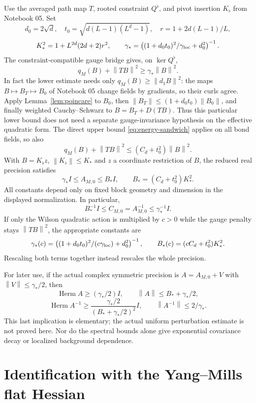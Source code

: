 \documentclass[11pt]{article}
\theoremstyle{remark}
\newcommand{\norm}[1]{\left\|#1\right\|}
\newcommand{\Herm}{\operatorname{Herm}}
\begin{document}
Use the averaged path map $T$, rooted constraint $Q^\flat$, and
pivot insertion $K_\flat$ from Notebook 05. Set
\[
 d_0=2\sqrt d,\quad
 t_0=\sqrt{d(L-1)(L^d-1)},\quad
 r=1+2d(L-1)/L,
\]
\[
 K_*^2=1+L^{2d}(2d+2)r^2,
 \qquad
 \gamma_*=
 \left((1+d_0t_0)^2/\gamma_{\rm loc}+d_0^2\right)^{-1}.
\]
The constraint-compatible gauge bridge gives, on $\ker Q^\flat$,
\[
 q_M(B)+\norm{TB}^2\ge\gamma_*\norm B^2.
\]
In fact the lower estimate needs only $q_M(B)\ge\norm{d_1B}^2$:
the maps $B\mapsto B_T\mapsto B_0$ of Notebook 05 change fields
by gradients, so their curls agree. Apply Lemma~\ref{lem:poincare}
to $B_0$, then $\norm{B_T}\le(1+d_0t_0)\norm{B_0}$, and finally
weighted Cauchy--Schwarz to $B=B_T+D(TB)$. Thus this particular
lower bound does not need a separate gauge-invariance hypothesis
on the effective quadratic form.
The direct upper bound \eqref{eq:energy-sandwich} applies on all
bond fields, so also
\[
 q_M(B)+\norm{TB}^2\le(C_d+t_0^2)\norm B^2.
\]
With $B=K_\flat z$, $\norm{K_\flat}\le K_*$ and $z$ a
coordinate restriction of $B$, the reduced real precision satisfies
\begin{equation}\label{eq:precision-sandwich}
 \gamma_*I\le A_{M,0}\le B_*I,
 \qquad B_*=(C_d+t_0^2)K_*^2.
\end{equation}
All constants depend only on fixed block geometry and dimension
in the displayed normalization. In particular,
\[
 B_*^{-1}I\le C_{M,0}=A_{M,0}^{-1}\le\gamma_*^{-1}I.
\]
If only the Wilson quadratic action is multiplied by $c>0$ while
the gauge penalty stays $\norm{TB}^2$, the appropriate constants are
\[
 \gamma_*(c)=
 \left((1+d_0t_0)^2/(c\gamma_{\rm loc})+d_0^2\right)^{-1},
 \qquad B_*(c)=(cC_d+t_0^2)K_*^2.
\]
Rescaling both terms together instead rescales the whole precision.

For later use, if the actual complex symmetric precision is
$A=A_{M,0}+V$ with $\norm V\le\gamma_*/2$, then
\[
 \Herm A\ge(\gamma_*/2)I,\qquad
 \norm A\le B_*+\gamma_*/2,
\]
\[
 \Herm A^{-1}\ge
 \frac{\gamma_*/2}{(B_*+\gamma_*/2)^2}I,
 \qquad\norm{A^{-1}}\le2/\gamma_*.
\]
This last implication is elementary; the actual uniform perturbation
estimate is not proved here. Nor do the spectral bounds alone give
exponential covariance decay or localized background dependence.

\section{Identification with the Yang--Mills flat Hessian}\label{sec:match}
\end{document}
